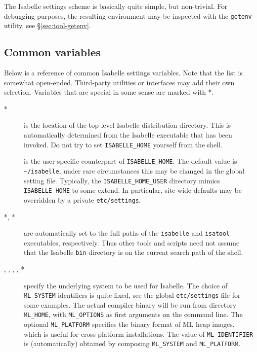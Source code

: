 \medskip The Isabelle settings scheme is basically quite simple, but
non-trivial.  For debugging purposes, the resulting environment may be
inspected with the \texttt{getenv} utility, see
\S\ref{sec:tool-getenv}.


\subsection{Common variables}

Below is a reference of common Isabelle settings variables. Note that
the list is somewhat open-ended. Third-party utilities or interfaces
may add their own selection. Variables that are special in some sense
are marked with *.

\begin{description}
\item[*] is the location of the top-level
  Isabelle distribution directory. This is automatically determined
  from the Isabelle executable that has been invoked.  Do not try to
  set \texttt{ISABELLE_HOME} yourself from the shell.

\item[] is the user-specific counterpart of
  \texttt{ISABELLE_HOME}. The default value is
  \texttt{\~\relax/isabelle}, under rare circumstances this may be
  changed in the global setting file.  Typically, the
  \texttt{ISABELLE_HOME_USER} directory mimics \texttt{ISABELLE_HOME}
  to some extend. In particular, site-wide defaults may be overridden
  by a private \texttt{etc/settings}.

\item[*, *] are automatically set to
  the full paths of the \texttt{isabelle} and \texttt{isatool}
  executables, respectively.  Thus other tools and scripts need not
  assume that the Isabelle \texttt{bin} directory is on the current
  search path of the shell.
  
\item[, , ,
  , *] specify the underlying {\ML}
  system to be used for Isabelle.  The choice of \texttt{ML_SYSTEM}
  identifiers is quite fixed, see the global \texttt{etc/settings} file for
  some examples. The actual compiler binary will be run from directory
  \texttt{ML_HOME}, with \texttt{ML_OPTIONS} as first arguments on the command
  line.  The optional \texttt{ML_PLATFORM} specifies the binary format of ML
  heap images, which is useful for cross-platform installations.  The value of
  \texttt{ML_IDENTIFIER} is (automatically) obtained by composing
  \texttt{ML_SYSTEM} and \texttt{ML_PLATFORM}.
  

\end{description}
